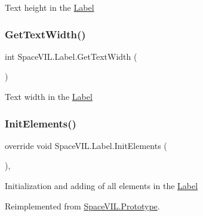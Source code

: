 Text height in the \mbox{\hyperlink{class_space_v_i_l_1_1_label}{Label}} 

\mbox{\label{class_space_v_i_l_1_1_label_a679b77d3cf9beaa4b470782b40e91cca}} 
\subsubsection{\texorpdfstring{Get\+Text\+Width()}{GetTextWidth()}}
{\footnotesize\ttfamily int Space\+V\+I\+L.\+Label.\+Get\+Text\+Width (\begin{DoxyParamCaption}{ }\end{DoxyParamCaption})\hspace{0.3cm}{\ttfamily [inline]}}



Text width in the \mbox{\hyperlink{class_space_v_i_l_1_1_label}{Label}} 

\mbox{\label{class_space_v_i_l_1_1_label_a2bdc7da304e91a50a820b8c8f722c0be}} 
\subsubsection{\texorpdfstring{Init\+Elements()}{InitElements()}}
{\footnotesize\ttfamily override void Space\+V\+I\+L.\+Label.\+Init\+Elements (\begin{DoxyParamCaption}{ }\end{DoxyParamCaption})\hspace{0.3cm}{\ttfamily [inline]}, {\ttfamily [virtual]}}



Initialization and adding of all elements in the \mbox{\hyperlink{class_space_v_i_l_1_1_label}{Label}} 



Reimplemented from \mbox{\hyperlink{class_space_v_i_l_1_1_prototype_ac3379fe02923ee155b5b0084abf27420}{Space\+V\+I\+L.\+Prototype}}.

\mbox{\label{class_space_v_i_l_1_1_label_ae14fde68f34a632420535f72b8f92d86}} 
